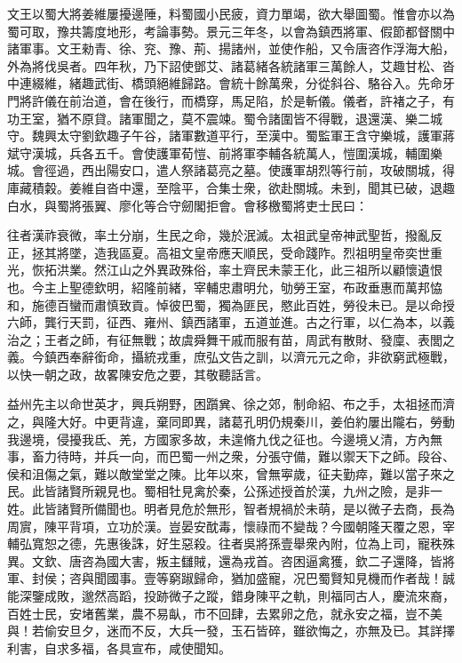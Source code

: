 \begin{pinyinscope}
文王以蜀大將姜維屢擾邊陲，料蜀國小民疲，資力單竭，欲大舉圖蜀。惟會亦以為蜀可取，豫共籌度地形，考論事勢。景元三年冬，以會為鎮西將軍、假節都督關中諸軍事。文王勑青、徐、兖、豫、荊、揚諸州，並使作船，又令唐咨作浮海大船，外為將伐吳者。四年秋，乃下詔使鄧艾、諸葛緒各統諸軍三萬餘人，艾趣甘松、沓中連綴維，緒趣武街、橋頭絕維歸路。會統十餘萬衆，分從斜谷、駱谷入。先命牙門將許儀在前治道，會在後行，而橋穿，馬足陷，於是斬儀。儀者，許褚之子，有功王室，猶不原貸。諸軍聞之，莫不震竦。蜀令諸圍皆不得戰，退還漢、樂二城守。魏興太守劉欽趣子午谷，諸軍數道平行，至漢中。蜀監軍王含守樂城，護軍蔣斌守漢城，兵各五千。會使護軍荀愷、前將軍李輔各統萬人，愷圍漢城，輔圍樂城。會徑過，西出陽安口，遣人祭諸葛亮之墓。使護軍胡烈等行前，攻破關城，得庫藏積糓。姜維自沓中還，至陰平，合集士衆，欲赴關城。未到，聞其已破，退趣白水，與蜀將張翼、廖化等合守劒閣拒會。會移檄蜀將吏士民曰：

往者漢祚衰微，率土分崩，生民之命，幾於泯滅。太祖武皇帝神武聖哲，撥亂反正，拯其將墜，造我區夏。高祖文皇帝應天順民，受命踐阼。烈祖明皇帝奕世重光，恢拓洪業。然江山之外異政殊俗，率土齊民未蒙王化，此三祖所以顧懷遺恨也。今主上聖德欽明，紹隆前緒，宰輔忠肅明允，劬勞王室，布政垂惠而萬邦恊和，施德百蠻而肅慎致貢。悼彼巴蜀，獨為匪民，愍此百姓，勞役未已。是以命授六師，龔行天罰，征西、雍州、鎮西諸軍，五道並進。古之行軍，以仁為本，以義治之；王者之師，有征無戰；故虞舜舞干戚而服有苗，周武有散財、發廩、表閭之義。今鎮西奉辭銜命，攝統戎重，庶弘文告之訓，以濟元元之命，非欲窮武極戰，以快一朝之政，故畧陳安危之要，其敬聽話言。

益州先主以命世英才，興兵朔野，困躓兾、徐之郊，制命紹、布之手，太祖拯而濟之，與隆大好。中更背違，棄同即異，諸葛孔明仍規秦川，姜伯約屢出隴右，勞動我邊境，侵擾我氐、羌，方國家多故，未遑脩九伐之征也。今邊境乂清，方內無事，畜力待時，并兵一向，而巴蜀一州之衆，分張守備，難以禦天下之師。段谷、侯和沮傷之氣，難以敵堂堂之陳。比年以來，曾無寕歲，征夫勤瘁，難以當子來之民。此皆諸賢所親見也。蜀相牡見禽於秦，公孫述授首於漢，九州之險，是非一姓。此皆諸賢所備聞也。明者見危於無形，智者規禍於未萌，是以微子去商，長為周賔，陳平背項，立功於漢。豈晏安酖毒，懷祿而不變哉？今國朝隆天覆之恩，宰輔弘寬恕之德，先惠後誅，好生惡殺。往者吳將孫壹舉衆內附，位為上司，寵秩殊異。文欽、唐咨為國大害，叛主讎賊，還為戎首。咨困逼禽獲，欽二子還降，皆將軍、封侯；咨與聞國事。壹等窮踧歸命，猶加盛寵，况巴蜀賢知見機而作者哉！誠能深鑒成敗，邈然高蹈，投跡微子之蹤，錯身陳平之軌，則福同古人，慶流來裔，百姓士民，安堵舊業，農不易畒，巿不回肆，去累卵之危，就永安之福，豈不美與！若偷安旦夕，迷而不反，大兵一發，玉石皆碎，雖欲悔之，亦無及已。其詳擇利害，自求多福，各具宣布，咸使聞知。


\end{pinyinscope}
